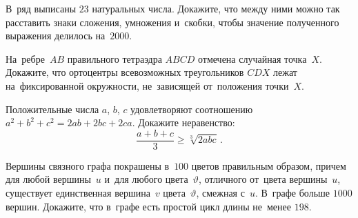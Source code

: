 


\begin{problems}

\item
В~ряд выписаны $23$ натуральных числа.
Докажите, что между ними можно так расставить знаки сложения, умножения
и~скобки, чтобы значение полученного выражения делилось на~$2000$.

\item
На~ребре~$AB$ правильного тетраэдра $ABCD$ отмечена случайная точка~$X$.
Докажите, что ортоцентры всевозможных треугольников $CDX$ лежат
на~фиксированной окружности, не~зависящей от~положения точки~$X$.

\item
Положительные числа $a$, $b$, $c$ удовлетворяют соотношению
$a^2 + b^2 + c^2 = 2ab + 2bc + 2ca$.
Докажите неравенство:
\[
    \frac{a + b + c}{3} \geq \sqrt[3]{2 a b c}
\, . \]

\item
Вершины связного графа покрашены в~$100$ цветов правильным образом, причем для
любой вершины~$u$ и~для любого цвета~$\vartheta$, отличного от~цвета
вершины~$u$, существует единственная вершина~$v$ цвета~$\vartheta$, смежная
с~$u$.
В~графе больше $1000$ вершин.
Докажите, что в~графе есть простой цикл длины не~менее $198$.

\end{problems}

